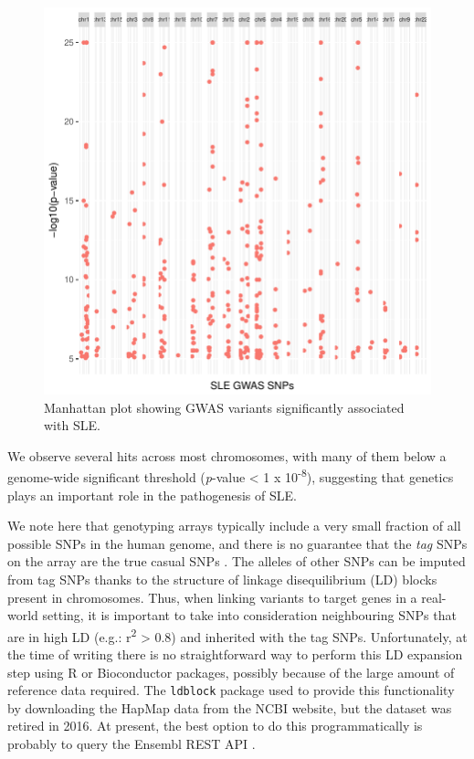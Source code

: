 \documentclass[9pt,a4paper,]{extarticle}
\theoremstyle{definition}
\theoremstyle{definition}
\theoremstyle{definition}
\theoremstyle{remark}
\begin{document}
\begin{figure}

{\centering \includegraphics{biocondutor-regulatory-genomics-workflow_files/figure-latex/figure5-1} 

}

\caption{Manhattan plot showing GWAS variants significantly associated with SLE.}\label{fig:figure5}
\end{figure}

We observe several hits across most chromosomes, with many of them below a genome-wide significant threshold (\emph{p}-value \textless{} 1 x 10\textsuperscript{-8}), suggesting that genetics plays an important role in the pathogenesis of SLE.

We note here that genotyping arrays typically include a very small fraction of all possible SNPs in the human genome, and there is no guarantee that the \emph{tag} SNPs on the array are the true casual SNPs \citep{Bush2012}.
The alleles of other SNPs can be imputed from tag SNPs thanks to the structure of linkage disequilibrium (LD) blocks present in chromosomes.
Thus, when linking variants to target genes in a real-world setting, it is important to take into consideration neighbouring SNPs that are in high LD (e.g.: r\textsuperscript{2} \textgreater{} 0.8) and inherited with the tag SNPs.
Unfortunately, at the time of writing there is no straightforward way to perform this LD expansion step using R or Bioconductor packages, possibly because of the large amount of reference data required.
The \texttt{ldblock} package \citep{Carey2017c} used to provide this functionality by downloading the HapMap data from the NCBI website, but the dataset was retired in 2016.
At present, the best option to do this programmatically is probably to query the Ensembl REST API \citep{Yates2015}.
\end{document}
